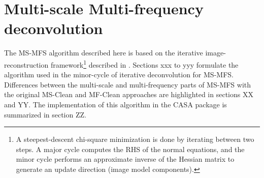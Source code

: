 \documentclass[structabstract]{stylefiles/aa}
\begin{document}
%





\section{Multi-scale Multi-frequency deconvolution}\label{Sec:ALGORITHM}

%
The MS-MFS algorithm described here is based on the iterative image-reconstruction
framework\footnote{A 
steepest-descent chi-square minimization is done by iterating between two steps.
A major cycle computes the RHS of the normal equations, and the
minor cycle performs an approximate inverse of the Hessian matrix to generate
an update direction (image model components). }
described in \citep{RAU_IEEE_2009}. 
Sections xxx to yyy formulate the algorithm used in the minor-cycle of iterative
deconvolution for MS-MFS. 
Differences between the multi-scale and multi-frequency parts of MS-MFS with
the original MS-Clean and MF-Clean approaches are highlighted in sections XX and YY.
The implementation of this algorithm in the CASA package is summarized in
section ZZ.
\end{document}

